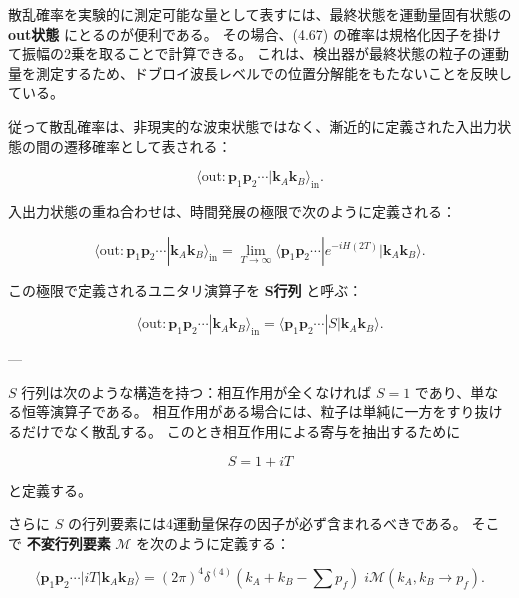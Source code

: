 \documentclass[a4paper,12pt]{article}
\begin{document}
散乱確率を実験的に測定可能な量として表すには、最終状態を運動量固有状態の \textbf{out状態} にとるのが便利である。  
その場合、(4.67) の確率は規格化因子を掛けて振幅の2乗を取ることで計算できる。  
これは、検出器が最終状態の粒子の運動量を測定するため、ドブロイ波長レベルでの位置分解能をもたないことを反映している。

従って散乱確率は、非現実的な波束状態ではなく、漸近的に定義された入出力状態の間の遷移確率として表される：

\begin{equation}
\langle \text{out} : \mathbf{p}_1 \mathbf{p}_2 \cdots | \mathbf{k}_A \mathbf{k}_B \rangle_{\text{in}}.
\tag{4.69}
\end{equation}


入出力状態の重ね合わせは、時間発展の極限で次のように定義される：

\begin{equation}
\langle \text{out} : \mathbf{p}_1 \mathbf{p}_2 \cdots | \mathbf{k}_A \mathbf{k}_B \rangle_{\text{in}}
= \lim_{T\to\infty} \langle \mathbf{p}_1 \mathbf{p}_2 \cdots | e^{-iH(2T)} | \mathbf{k}_A \mathbf{k}_B \rangle.
\tag{4.70}
\end{equation}

この極限で定義されるユニタリ演算子を \textbf{S行列} と呼ぶ：

\begin{equation}
\langle \text{out} : \mathbf{p}_1 \mathbf{p}_2 \cdots | \mathbf{k}_A \mathbf{k}_B \rangle_{\text{in}}
= \langle \mathbf{p}_1 \mathbf{p}_2 \cdots | S | \mathbf{k}_A \mathbf{k}_B \rangle.
\tag{4.71}
\end{equation}

---

$S$ 行列は次のような構造を持つ：相互作用が全くなければ $S=1$ であり、単なる恒等演算子である。  
相互作用がある場合には、粒子は単純に一方をすり抜けるだけでなく散乱する。  
このとき相互作用による寄与を抽出するために

\begin{equation}
S = 1 + iT
\tag{4.72}
\end{equation}

と定義する。

さらに $S$ の行列要素には4運動量保存の因子が必ず含まれるべきである。  
そこで \textbf{不変行列要素} $\mathcal{M}$ を次のように定義する：

\begin{equation}
\langle \mathbf{p}_1 \mathbf{p}_2 \cdots | iT | \mathbf{k}_A \mathbf{k}_B \rangle
= (2\pi)^4 \delta^{(4)}(k_A + k_B - \sum p_f) \; i\mathcal{M}(k_A, k_B \to p_f).
\tag{4.73}
\end{equation}
\end{document}
